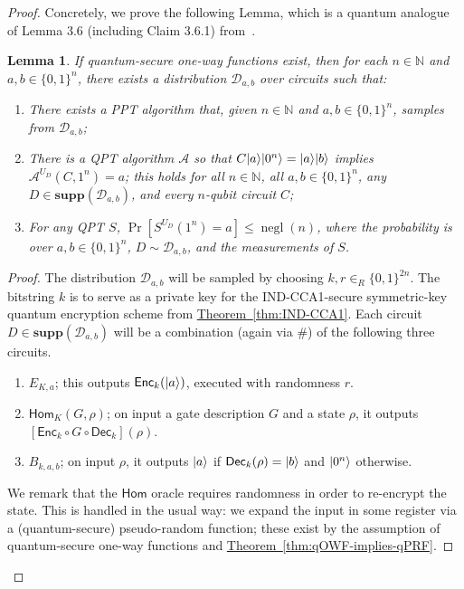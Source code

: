 \documentclass[11pt]{article}
\numberwithin{equation}{section}
\newtheorem{lemma}[theorem]{Lemma}
\newcommand{\opn}{\operatorname}
\newcommand{\expref}[2]{\texorpdfstring{\hyperref[#2]{#1~\ref{#2}}}{#1~\ref{#2}}}
\newcommand{\algo}{\mathcal}
\newcommand{\negl}{\opn{negl}}
\newcommand{\Enc}{\ensuremath{\mathsf{Enc}}\xspace}
\newcommand{\Dec}{\ensuremath{\mathsf{Dec}}\xspace}
\newcommand{\Homorcl}{\ensuremath{\mathsf{Hom}}\xspace}
\newcommand{\inrand}{\in_R}
\newcommand\supp{\textbf{supp}}
\begin{document}
{\begin{proof}
Concretely, we prove the following Lemma, which is a quantum analogue of Lemma 3.6 (including Claim 3.6.1) from~\cite{BGIRSVY12}.

\begin{lemma}\label{lemma-circuitdistribution}
If quantum-secure one-way functions exist, then for each $n \in \mathbb{N}$ and $a, b\in\{0,1\}^n$, there exists a distribution $\mathcal{D}_{a,b}$ over circuits such that:
\begin{enumerate}
\item There exists a PPT algorithm that, given $n\in\mathbb{N}$ and $a,b\in\{0,1\}^n$, samples from $\mathcal{D}_{a,b}$;
\item There is a QPT algorithm $\algo{A}$ so that $C {\left\vert{a}\right\rangle} {\left\vert{0^n}\right\rangle} = {\left\vert{a}\right\rangle}{\left\vert{b}\right\rangle}$ implies $\algo{A}^{U_D}(C, 1^n) = a$; this holds for all $n \in \mathbb{N}$, all $a,b\in\{0,1\}^n$, any $D\in \supp(\mathcal{D}_{a,b})$, and every $n$-qubit circuit $C$;
\item{For any QPT $S$, $\Pr[S^{U_D}(1^n)=a] \leq \negl(n)$, where the probability is over $a,b\in\{0,1\}^n$, $D\sim \mathcal{D}_{a,b}$, and the measurements of $S$.}	
\end{enumerate}
\end{lemma}

\begin{proof} The distribution $\mathcal D_{a, b}$ will be sampled by choosing $k, r \inrand \{0, 1\}^{2n}$. The bitstring $k$ is to serve as a private key for the IND-CCA1-secure symmetric-key quantum encryption scheme from \expref{Theorem}{thm:IND-CCA1}. Each circuit $D\in \supp(\mathcal{D}_{a,b})$ will be a combination (again via \#) of the following three circuits. 
\begin{enumerate}
\item $E_{K,a}$; this outputs $\Enc_k(\ket{a})$, executed with randomness $r$. 
\item $\Homorcl_K(G,\rho)$; on input a gate description $G$ and a state $\rho$, it outputs $[\Enc_k \circ G \circ \Dec_k](\rho)$.
\item $B_{k,a,b}$; on input $\rho$, it outputs ${\left\vert{a}\right\rangle}$ if $\Dec_{k}(\rho)= \ket{b}$ and ${\left\vert{0^n}\right\rangle}$ otherwise.
\end{enumerate}
We remark that the $\Homorcl$ oracle requires randomness in order to re-encrypt the state. This is handled in the usual way: we expand the input in some register via a (quantum-secure) pseudo-random function; these exist by the assumption of quantum-secure one-way functions and \expref{Theorem}{thm:qOWF-implies-qPRF}. 


\end{proof}
\end{proof}}
\end{document}
